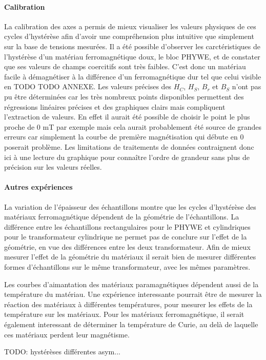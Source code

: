 \paragraph*{Calibration}
La calibration des axes a permis de mieux visualiser les valeurs physiques de ces cycles d'hystérèse afin d'avoir une compréhension plus intuitive que simplement sur la base de tensions mesurées. Il a été possible d'observer les carctéristiques de l'hystérèse d'un matériau ferromagnétique doux, le bloc PHYWE, et de constater que ses valeurs de champs coercitifs sont très faibles. C'est donc un matériau facile à démagnétiser à la différence d'un ferromagnétique dur tel que celui visible en TODO TODO ANNEXE. Les valeurs précises des \(H_C\), \(H_S\), \(B_r\) et \(B_S\) n'ont pas pu être déterminées car les très nombreux points disponibles permettent des régressions linéaires précises et des graphiques clairs mais compliquent l'extraction de valeurs. En effet il aurait été possible de choisir le point le plus proche de 0 \si{\milli\tesla} par exemple mais cela aurait probablement été source de grandes erreurs car simplement la courbe de première magnétisation qui débute en 0 poserait problème. Les limitations de traitements de données contraignent donc ici à une lecture du graphique pour connaître l'ordre de grandeur sans plus de précision sur les valeurs réelles.

\paragraph*{Autres expériences}
La variation de l'épaisseur des échantillons montre que les cycles d'hystérèse des matériaux ferromagnétique dépendent de la géométrie de l'échantillons. La différence entre les échantillons rectangulaires pour le PHYWE et cylindriques pour le transformateur cylindrique ne permet pas de conclure sur l'effet de la géométrie, en vue des différences entre les deux transformateur. Afin de mieux mesurer l'effet de la géométrie du matériaux il serait bien de mesurer différentes formes d'échantillons sur le même transformateur, avec les mêmes paramètres.

Les courbes d'aimantation des matériaux paramagnétiques dépendent aussi de la température du matériau. Une expérience interessante pourrait être de mesurer la réaction des matériaux à différentes températures, pour mesurer les effets de la température sur les matériaux. Pour les matériaux ferromagnétique, il serait également interessant de déterminer la température de Curie, au delà de laquelle ces matériaux perdent leur magnétisme.

TODO: hystérèses différentes asym...
